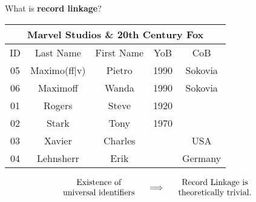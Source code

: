 \begin{frame}{\Large What is \textbf{record linkage}?}
\scriptsize
\begin{center}
\vskip -0.1cm
\begin{tabular}{|c|c|c||c|c|}
\hline
	\multicolumn{5}{|c|}{Marvel Studios \;\; \& \;\; 20th Century Fox} \\
\hline
	ID & Last Name & First Name & YoB & CoB \\
\hline
	\rowcolor{lightGray}
	05 & Maximo{\color{red}(ff|v)} & Pietro & 1990 & Sokovia \\
\hline
	\rowcolor{lightGray}
	06 & Maximo{\color{red}ff} & Wanda & 1990 & Sokovia \\
\hline
	\rowcolor{bgOrange}
	01 & Rogers & Steve & 1920 & \\
\hline
	\rowcolor{bgOrange}
	02 & Stark & Tony & 1970 & \\
\hline
	\rowcolor{lightTurquoise}
	03 & Xavier & Charles & & USA \\
\hline
	\rowcolor{lightTurquoise}
	04 & Lehnsherr & Erik & & Germany \\
\hline
\end{tabular}
\end{center}

\pause

\vskip -0.1cm

\large
\begin{equation*}
\begin{array}{c}
	\textnormal{Existence of} \\
	\textnormal{universal identifiers}
\end{array}
\quad
\Longrightarrow
\quad
\begin{array}{c}
	\textnormal{Record Linkage is} \\
	\textnormal{theoretically trivial.}
\end{array}
\end{equation*}

\end{frame}
\normalsize

